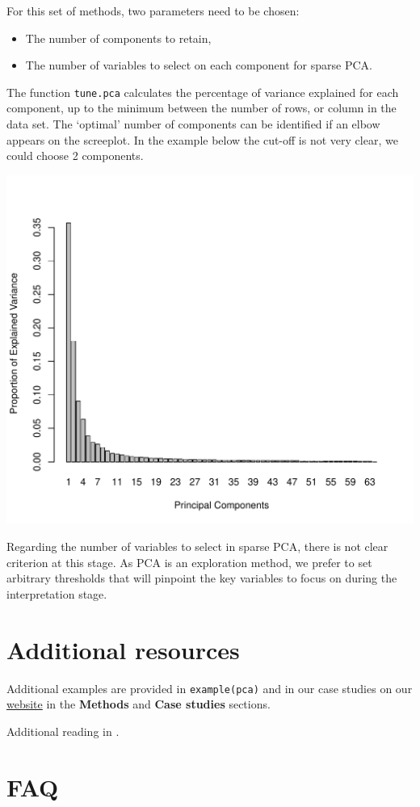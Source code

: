 \documentclass[]{book}
\providecommand{\tightlist}{%
  \setlength{\itemsep}{0pt}\setlength{\parskip}{0pt}}
\begin{document}
For this set of methods, two parameters need to be chosen:

\begin{itemize}
\tightlist
\item
  The number of components to retain,
\item
  The number of variables to select on each component for sparse PCA.
\end{itemize}

The function \texttt{tune.pca} calculates the percentage of variance explained for each component, up to the minimum between the number of rows, or column in the data set. The `optimal' number of components can be identified if an elbow appears on the screeplot. In the example below the cut-off is not very clear, we could choose 2 components.

\begin{center}\includegraphics[width=0.5\linewidth,]{Figures/03-tune-pca-1} \end{center}

Regarding the number of variables to select in sparse PCA, there is not clear criterion at this stage. As PCA is an exploration method, we prefer to set arbitrary thresholds that will pinpoint the key variables to focus on during the interpretation stage.

\hypertarget{additional-resources}{%
\section{Additional resources}\label{additional-resources}}

Additional examples are provided in \texttt{example(pca)} and in our case studies on our \href{http://www.mixomics.org}{website} in the \textbf{Methods} and \textbf{Case studies} sections.

Additional reading in \citep{She08}.

\hypertarget{faq}{%
\section{FAQ}\label{faq}}
\end{document}
